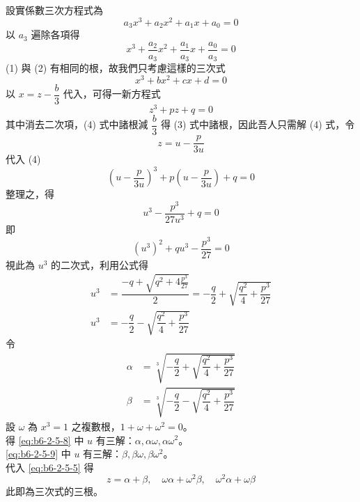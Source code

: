 設實係數三次方程式為
\begin{equation}
a_3 x^3 + a_2 x^2 + a_1 x + a_0 = 0 \label{eq:b6-2-5-1}
\end{equation}
以 $a_3$ 遍除各項得
\begin{equation}
x^3 + \dfrac{a_2}{a_3}x^2 + \dfrac{a_1}{a_3}x + \dfrac{a_0}{a_3} = 0 \label{eq:b6-2-5-2}
\end{equation}
(1) 與 (2) 有相同的根，故我們只考慮這樣的三次式
\begin{equation}
x^3 + bx^2 + cx + d = 0 \label{eq:b6-2-5-3}
\end{equation}
以 $x = z - \dfrac{b}{3}$ 代入，可得一新方程式
\begin{equation}
z^3 + pz + q = 0 \label{eq:b6-2-5-4}
\end{equation}
其中消去二次項，(4) 式中諸根減 $\dfrac{b}{3}$ 得 (3) 式中諸根，因此吾人只需解 (4) 式，令
\begin{equation}
z = u - \dfrac{p}{3u} \label{eq:b6-2-5-5}
\end{equation}
代入 (4)
\[ \left( u - \dfrac{p}{3u} \right)^3 + p\left( u - \dfrac{p}{3u} \right) + q = 0 \]
整理之，得
\begin{equation}
u^3 - \dfrac{p^3}{27u^3} + q = 0 \label{eq:b6-2-5-6}
\end{equation}
即
\begin{equation}
(u^3)^2 + qu^3 - \dfrac{p^3}{27} = 0 \label{eq:b6-2-5-7}
\end{equation}
視此為 $u^3$ 的二次式，利用公式得
\begin{align}
u^3 &= \dfrac{-q + \sqrt{q^2 + 4\frac{p^3}{27}}}{2} = -\dfrac{q}{2} + \sqrt{\dfrac{q^2}{4} + \dfrac{p^3}{27}} \label{eq:b6-2-5-8} \\
u^3 &= -\dfrac{q}{2} - \sqrt{\dfrac{q^2}{4} + \dfrac{p^3}{27}} \label{eq:b6-2-5-9}
\end{align}
令
\begin{align*}
\alpha &= \sqrt[3]{-\dfrac{q}{2} + \sqrt{\dfrac{q^2}{4} + \dfrac{p^3}{27}}} \tag{I} \\
\beta &= \sqrt[3]{-\dfrac{q}{2} - \sqrt{\dfrac{q^2}{4} + \dfrac{p^3}{27}}} \tag{II}
\end{align*}
設 $\omega$ 為 $x^3=1$ 之複數根，$1+\omega+\omega^2=0$。\\
得 \eqref{eq:b6-2-5-8} 中 $u$ 有三解：$\alpha, \alpha\omega, \alpha\omega^2$。\\
\eqref{eq:b6-2-5-9} 中 $u$ 有三解：$\beta, \beta\omega, \beta\omega^2$。\\
代入 \eqref{eq:b6-2-5-5} 得
\[ z = \alpha+\beta, \quad \omega\alpha+\omega^2\beta, \quad \omega^2\alpha+\omega\beta \]
此即為三次式的三根。

